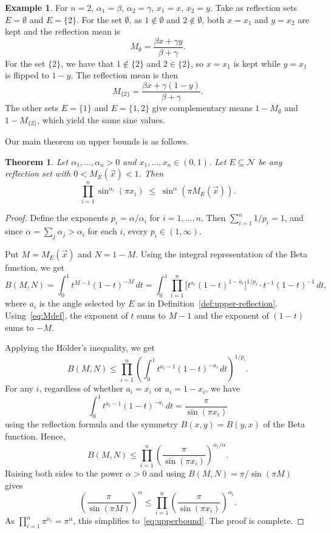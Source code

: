 \documentclass[12pt]{amsart}
\newtheorem{theorem}{Theorem}[section]
\theoremstyle{definition}
\newtheorem{example}{Example}[section]
\begin{document}
\begin{example}
For $n=2$, $\alpha_1=\beta$, $\alpha_2=\gamma$, $x_1=x$, $x_2=y$. Take as reflection sets $E=\emptyset$ and $E=\{2\}$. For the set $\emptyset$, as $1\notin \emptyset$ and $2\notin\emptyset$, both $x=x_1$ and $y=x_2$ are kept and the reflection mean is
\[
M_\emptyset = \frac{\beta x + \gamma y}{\beta+\gamma}.\]
For the set $\{2\}$, we have that $1\notin\{2\}$ and $2\in\{2\}$, so $x=x_1$ is kept while $y=x_1$ is flipped to $1-y$. The reflection mean is then
\[
M_{\{2\}} = \frac{\beta x + \gamma(1-y)}{\beta+\gamma}.
\]
The other sets $E=\{1\}$ and $E=\{1,2\}$ give complementary means $1-M_\emptyset$ and $1-M_{\{2\}}$, which yield the same sine values.
\end{example}

Our main theorem on upper bounds is as follows.

\begin{theorem}\label{thm:upper-main}
Let $\alpha_1,\ldots,\alpha_n > 0$ and $x_1,\ldots,x_n \in (0,1)$. Let
$E \subseteq \mathcal N$ be any reflection set with $0 < M_E(\vec x) < 1$. Then
\begin{equation}\label{eq:upperbound}
\prod_{i=1}^{n} \sin^{\alpha_i}(\pi x_i) \;\leq\; \sin^{\alpha}(\pi M_E(\vec x)).
\end{equation}
\end{theorem}

\begin{proof}
Define the exponents $p_i = \alpha/\alpha_i$ for $i=1,\ldots,n$. Then $\sum_{i=1}^{n} 1/p_i = 1$,
and since $\alpha=\sum_j\alpha_j>\alpha_i$ for each $i$, every $p_i\in(1,\infty)$.

Put $M = M_E(\vec x)$ and $N = 1 - M$. Using the integral representation of the Beta function, we get
\[
B(M,N) = \int_{0}^{1} t^{M-1}(1-t)^{-M}\,dt
= \int_{0}^{1} \prod_{i=1}^{n} \bigl[t^{a_i}(1-t)^{1-a_i}\bigr]^{1/p_i} \cdot t^{-1}(1-t)^{-1}\,dt,
\]
where $a_i$ is the angle selected by $E$ as in Definition~\ref{def:upper-reflection}. Using~\eqref{eq:Mdef}, the exponent of $t$ sums to $M-1$ and the exponent of $(1-t)$ sums to $-M$.

Applying the H\"older's inequality, we get
\[
B(M,N) \leq \prod_{i=1}^{n} \left(\int_{0}^{1} t^{a_i-1}(1-t)^{-a_i}\,dt\right)^{1/p_i}.
\]
For any $i$, regardless of whether $a_i = x_i$ or $a_i = 1 - x_i$, we have
\[
\int_{0}^{1} t^{a_i-1}(1-t)^{-a_i}\,dt = \frac{\pi}{\sin(\pi x_i)}
\]
using the reflection formula and the symmetry $B(x,y)=B(y,x)$ of the Beta function. Hence,
\[
B(M,N) \leq \prod_{i=1}^{n} \left(\frac{\pi}{\sin(\pi x_i)}\right)^{\alpha_i/\alpha}.
\]
Raising both sides to the power $\alpha > 0$ and using $B(M,N) = \pi/\sin(\pi M)$ gives
\[
\left(\frac{\pi}{\sin(\pi M)}\right)^{\alpha} \leq \prod_{i=1}^{n} \left(\frac{\pi}{\sin(\pi x_i)}\right)^{\alpha_i}.
\]
As $\prod_{i=1}^{n} \pi^{\alpha_i} = \pi^{\alpha}$, this simplifies to~\eqref{eq:upperbound}. The proof is complete.
\end{proof}
\end{document}
